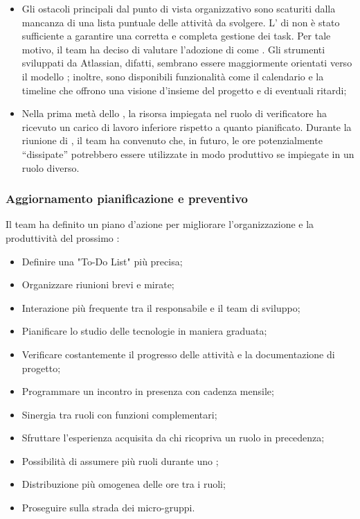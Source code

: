 \begin{itemize}
  \item Gli ostacoli principali dal punto di vista organizzativo sono scaturiti dalla mancanza di una lista puntuale delle attività da svolgere. L' di  non è stato sufficiente a garantire una corretta e completa gestione dei task. Per tale motivo, il team ha deciso di valutare l'adozione di  come . Gli strumenti sviluppati da Atlassian, difatti, sembrano essere maggiormente orientati verso il modello ; inoltre, sono disponibili funzionalità come il calendario e la timeline che offrono una visione d'insieme del progetto e di eventuali ritardi;
  \item Nella prima metà dello , la risorsa impiegata nel ruolo di verificatore ha ricevuto un carico di lavoro inferiore rispetto a quanto pianificato. Durante la riunione di , il team ha convenuto che, in futuro, le ore potenzialmente “dissipate” potrebbero essere utilizzate in modo produttivo se impiegate in un ruolo diverso.
\end{itemize}

\subsubsection{Aggiornamento pianificazione e preventivo}
\par Il team ha definito un piano d'azione per migliorare l'organizzazione e la produttività del prossimo :
\begin{itemize}
  \item Definire una "To-Do List" più precisa;
  \item Organizzare riunioni brevi e mirate;
  \item Interazione più frequente tra il responsabile e il team di sviluppo;
  \item Pianificare lo studio delle tecnologie in maniera graduata;
  \item Verificare costantemente il progresso delle attività e la documentazione di progetto;
  \item Programmare un incontro in presenza con cadenza mensile;
  \item Sinergia tra ruoli con funzioni complementari;
  \item Sfruttare l'esperienza acquisita da chi ricopriva un ruolo in precedenza;
  \item Possibilità di assumere più ruoli durante uno ;
  \item Distribuzione più omogenea delle ore tra i ruoli;
  \item Proseguire sulla strada dei micro-gruppi.
\end{itemize}

